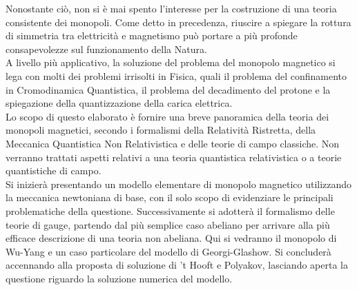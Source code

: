 Nonostante ciò, non si è mai spento l'interesse per la costruzione di una
teoria consistente dei monopoli. Come detto in precedenza, riuscire a spiegare
la rottura di simmetria tra elettricità e magnetismo può
portare a più profonde consapevolezze sul funzionamento della Natura.\\

A livello più applicativo, la soluzione del problema del monopolo magnetico si
lega con molti dei problemi irrisolti in Fisica, quali il problema del confinamento
in Cromodinamica Quantistica, il problema del decadimento del protone e la spiegazione
della quantizzazione della carica elettrica.\\

Lo scopo di questo elaborato è fornire una breve panoramica della teoria dei monopoli
magnetici, secondo i formalismi della Relatività Ristretta, della Meccanica Quantistica
Non Relativistica e delle teorie di campo classiche. Non verranno trattati aspetti
relativi a una teoria quantistica relativistica o a teorie quantistiche di campo.\\

Si inizierà presentando un modello elementare di monopolo magnetico utilizzando
la meccanica newtoniana di base, con il solo scopo di evidenziare le principali
problematiche della questione. Successivamente si adotterà il formalismo delle
teorie di gauge, partendo dal più semplice caso abeliano per arrivare alla
più efficace descrizione di una teoria non abeliana. Qui si vedranno il monopolo
di Wu-Yang e un caso particolare del modello di Georgi-Glashow.
Si concluderà accennando alla proposta di soluzione di 't Hooft e Polyakov, lasciando
aperta la questione riguardo la soluzione numerica del modello.












